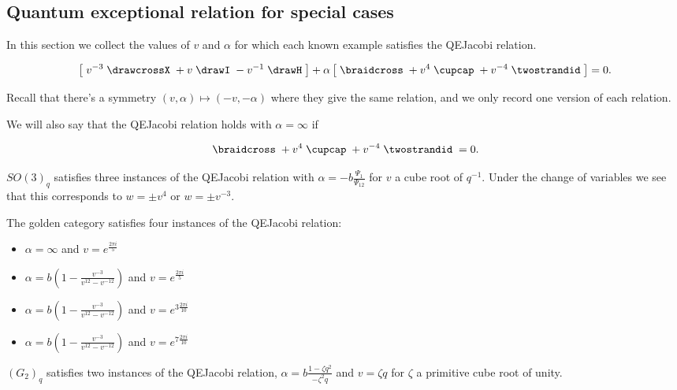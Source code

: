 \documentclass[12pt]{amsart}
\begin{document}
\subsection{Quantum exceptional relation for special cases}

In this section we collect the values of $v$ and $\alpha$ for which each known example satisfies the QEJacobi relation.

\begin{equation*}
\left[\; v^{-3} \;
\drawcrossX
\;+ v \;
\drawI
\; -v^{-1} \;
 \drawH
\;\right]
 + \alpha
\left[\; \braidcross \;
 + v^{4}\;
\cupcap
\; + v^{-4} \;
 \twostrandid \;
 \right] = 0.
 \end{equation*}
 
Recall that there's a symmetry $(v,\alpha) \mapsto (-v,-\alpha)$ where they give the same relation, and we only record one version of each relation.

We will also say that the QEJacobi relation holds with $\alpha=\infty$ if

\begin{equation*}
\braidcross \;
 + v^{4}\;
\cupcap
\; + v^{-4} \;
 \twostrandid \;= 0.
 \end{equation*}


\begin{lemma}
$SO(3)_q$ satisfies three instances of the QEJacobi relation with $\alpha = -b \frac{\Psi_1}{\Psi_{12}} $ for $v$ a cube root of $q^{-1}$.  Under the change of variables we see that this corresponds to $w = \pm v^4$ or $w = \pm v^{-3}$.
\end{lemma}

\begin{lemma}
The golden category satisfies four instances of the QEJacobi relation:
 \begin{itemize}
 \item $\alpha=\infty$ and $v = e^{\frac{2 \pi i}{5}}$
  \item $\alpha = b\left(1-\frac{v^{-3}}{v^{12}-v^{-12}}\right)$ and $v = e^{\frac{2 \pi i}{5}}$
 \item $\alpha = b\left(1-\frac{v^{-3}}{v^{12}-v^{-12}}\right)$ and $v = e^{3 \frac{2 \pi i}{10}}$
 \item $\alpha = b\left(1-\frac{v^{-3}}{v^{12}-v^{-12}}\right)$ and $v = e^{7 \frac{2 \pi i}{10}}$ 
 \end{itemize}
 \end{lemma}

\begin{lemma}
$(G_2)_q$ satisfies two instances of the QEJacobi relation, $\alpha = b \frac{1-\zeta q^2}{-\zeta^2 q}$ and $v = \zeta q$ for $\zeta$ a primitive cube root of unity.
\end{lemma}
\end{document}
